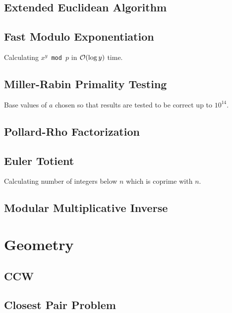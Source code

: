 \documentclass[landscape,8pt]{article}
\begin{document}
\begin{multicols}{2}
  \subsection{Extended Euclidean Algorithm}
    
  \subsection{Fast Modulo Exponentiation}
  Calculating \texttt{$x^y$ mod $p$} in $\order{\log y}$ time.
    

  \subsection{Miller-Rabin Primality Testing}
  Base values of $a$ chosen so that results are tested to be correct up to $10^14$.
  

  \subsection{Pollard-Rho Factorization}
  
  \subsection{Euler Totient}
  Calculating number of integers below $n$ which is coprime with $n$.
    

  \subsection{Modular Multiplicative Inverse}
    

\columnbreak
\section{Geometry}
  \subsection{CCW}
    
  \subsection{Closest Pair Problem}


\end{multicols}
\end{document}
